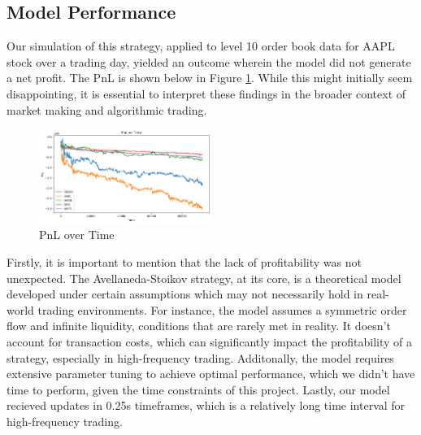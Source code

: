 \documentclass[letterpaper, 10 pt, conference]{ieeeconf}  %
\begin{document}
\subsection{Model Performance}

Our simulation of this strategy, applied to level 10 order book data for AAPL stock over a trading day, yielded an outcome wherein the model did not generate a net profit. The PnL is shown below in Figure \ref{fig:pnl}. While this might initially seem disappointing, it is essential to interpret these findings in the broader context of market making and algorithmic trading. 

\begin{figure}[h]
\centering
\includegraphics[width=0.5\textwidth]{pnl.png}
\caption{PnL over Time}
\label{fig:pnl}
\end{figure}


Firstly, it is important to mention that the lack of profitability was not unexpected. The Avellaneda-Stoikov strategy, at its core, is a theoretical model developed under certain assumptions which may not necessarily hold in real-world trading environments. For instance, the model assumes a symmetric order flow and infinite liquidity, conditions that are rarely met in reality. It doesn't account for transaction costs, which can significantly impact the profitability of a strategy, especially in high-frequency trading. Additonally, the model requires extensive parameter tuning to achieve optimal performance, which we didn't have time to perform, given the time constraints of this project. Lastly, our model recieved updates in 0.25s timeframes, which is a relatively long time interval for high-frequency trading.   
\end{document}
